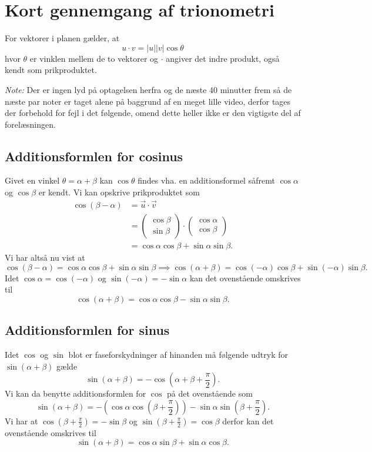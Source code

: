 
\section{Kort gennemgang af trionometri}
For vektorer i planen gælder, at
\[ 
u\cdot v = |u||v|\cos\theta
\]
hvor $\theta$ er vinklen mellem de to vektorer og $\cdot$ angiver det indre produkt, også kendt som prikproduktet.

\textit{Note:} Der er ingen lyd på optagelsen herfra og de næste 40 minutter frem så de næste par noter er taget alene på baggrund af en meget lille video, derfor tages der forbehold for fejl i det følgende, omend dette heller ikke er den vigtigste del af forelæsningen.

\subsection{Additionsformlen for cosinus}
Givet en vinkel $\theta = \alpha + \beta$ kan $\cos\theta$ findes vha. en additionsformel såfremt $\cos\alpha$ og $\cos\beta$ er kendt. Vi kan opskrive prikproduktet som
\begin{align*}
\cos (\beta - \alpha) &= \Vec{u}\cdot \Vec{v} \\
&= \begin{pmatrix}
  \cos \beta \\
  \sin \beta
\end{pmatrix}
\cdot
\begin{pmatrix}
  \cos\alpha \\
  \cos\beta
\end{pmatrix} \\
&= \cos\alpha \cos\beta + \sin\alpha \sin\beta
.\end{align*}
Vi har altså nu vist at
\[ 
  \cos(\beta-\alpha) = \cos\alpha \cos\beta + \sin\alpha \sin\beta \implies \cos(\alpha + \beta) = \cos{(-\alpha)}\cos\beta + \sin{(-\alpha)}\sin\beta
.\]
Idet $\cos\alpha = \cos(-\alpha)$ og $\sin(-\alpha) = -\sin\alpha$ kan det ovenstående omskrives til
\[ 
\cos(\alpha + \beta) = \cos\alpha \cos\beta - \sin\alpha \sin\beta
.\]

\subsection{Additionsformlen for sinus}
Idet $\cos$ og $\sin$ blot er faseforskydninger af hinanden må følgende udtryk for $\sin(\alpha + \beta)$ gælde
\[ 
\sin(\alpha + \beta) = -\cos(\alpha + \beta + \frac{\pi}{2})
.\]
Vi kan da benytte additionsformlen for $\cos$ på det ovenstående som
\[ 
\sin(\alpha + \beta) = -\left( \cos\alpha \cos(\beta + \frac{\pi}{2}) \right) - \sin\alpha \sin(\beta + \frac{\pi}{2})
.\]
Vi har at $\cos(\beta + \frac{\pi}{2}) = -\sin\beta$ og $\sin(\beta + \frac{\pi}{2}) = \cos\beta$ derfor kan det ovenstående omskrives til
\[ 
\sin(\alpha + \beta) = \cos\alpha \sin\beta + \sin\alpha \cos\beta
.\]

